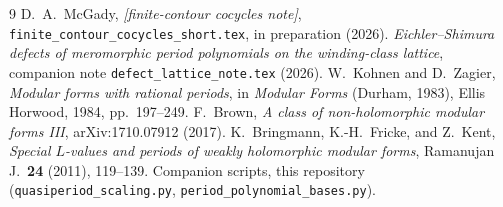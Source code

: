 \documentclass[11pt]{article}
\begin{document}
\begin{thebibliography}{9}
 D.~A.~McGady, \emph{[finite-contour cocycles note]},
\texttt{finite\_contour\_cocycles\_short.tex}, in preparation (2026).
 \emph{Eichler--Shimura defects of meromorphic period polynomials on
the winding-class lattice}, companion note \texttt{defect\_lattice\_note.tex} (2026).
 W.~Kohnen and D.~Zagier, \emph{Modular forms with rational periods}, in
\emph{Modular Forms} (Durham, 1983), Ellis Horwood, 1984, pp.~197--249.
 F.~Brown, \emph{A class of non-holomorphic modular forms III},
arXiv:1710.07912 (2017).
 K.~Bringmann, K.-H.~Fricke, and Z.~Kent, \emph{Special $L$-values and
periods of weakly holomorphic modular forms}, Ramanujan J.\ \textbf{24} (2011), 119--139.
 Companion scripts, this repository
(\texttt{quasiperiod\_scaling.py}, \texttt{period\_polynomial\_bases.py}).
\end{thebibliography}
\end{document}
